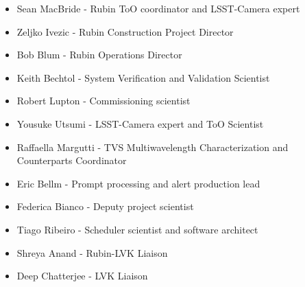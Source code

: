 \begin{itemize}

    \item Sean MacBride - Rubin ToO coordinator and LSST-Camera expert
    \item Zeljko Ivezic - Rubin Construction Project Director
    \item Bob Blum - Rubin Operations Director
    \item Keith Bechtol - System Verification and Validation Scientist
    \item Robert Lupton - Commissioning scientist
    \item Yousuke Utsumi - LSST-Camera expert and ToO Scientist
    \item Raffaella Margutti - TVS Multiwavelength Characterization and Counterparts Coordinator
    \item Eric Bellm - Prompt processing and alert production lead
    \item Federica Bianco - Deputy project scientist
    \item Tiago Ribeiro - Scheduler scientist and software architect
    \item Shreya Anand - Rubin-LVK Liaison
    \item Deep Chatterjee - LVK Liaison
\end{itemize}
